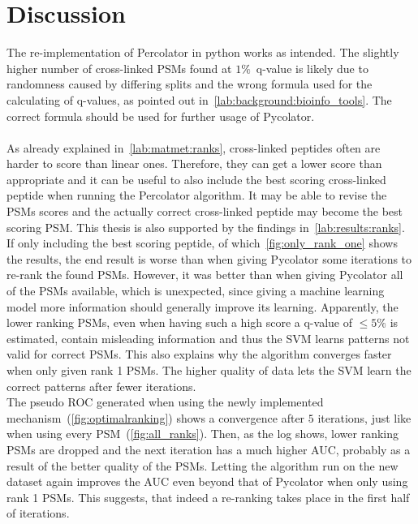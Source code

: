 
\chapter{Discussion}
\label{discussion}
The re-implementation of Percolator in python works as intended. %
The slightly higher number of cross-linked PSMs found at $1\%$~q-value is likely due to randomness caused by differing splits and the wrong formula used for the calculating of q-values, as pointed out in~\ref{lab:background:bioinfo_tools}. The correct formula should be used for further usage of Pycolator.\\\\
As already explained in~\ref{lab:matmet:ranks}, cross-linked peptides often are harder to score than linear ones. Therefore, they can get a lower score than appropriate and it can be useful to also include the best scoring cross-linked peptide when running the Percolator algorithm. It may be able to revise the PSMs scores and the actually correct cross-linked peptide may become the best scoring PSM. This thesis is also supported by the findings in~\ref{lab:results:ranks}. If only including the best scoring peptide, of which~\ref{fig:only_rank_one} shows the results, the end result is worse than when giving Pycolator some iterations to re-rank the found PSMs. However, it was better than when giving Pycolator all of the PSMs available, which is unexpected, since giving a machine learning model more information should generally improve its learning. Apparently, the lower ranking PSMs, even when having such a high score a q-value of $\leq5\%$ is estimated, contain misleading information and thus the SVM learns patterns not valid for correct PSMs. This also explains why the algorithm converges faster when only given rank 1 PSMs. The higher quality of data lets the SVM learn the correct patterns after fewer iterations. \\
The pseudo ROC generated when using the newly implemented mechanism~(\ref{fig:optimalranking}) shows a convergence after $5$ iterations, just like when using every PSM~(\ref{fig:all_ranks}). Then, as the log shows, lower ranking PSMs are dropped and the next iteration has a much higher AUC, probably as a result of the better quality of the PSMs. Letting the algorithm run on the new dataset again improves the AUC even beyond that of Pycolator when only using rank 1 PSMs. This suggests, that indeed a re-ranking takes place in the first half of iterations.\\
